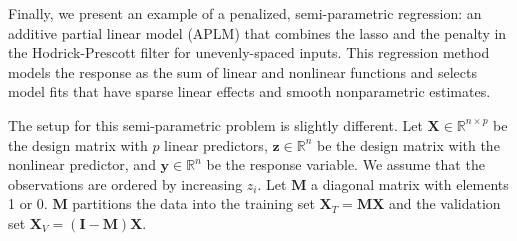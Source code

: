 \documentclass[10pt,letterpaper]{article}
\begin{document}
Finally, we present an example of a penalized, semi-parametric regression: an additive partial linear model (APLM) that combines the lasso and the penalty in the Hodrick-Prescott filter for unevenly-spaced inputs. This regression method models the response as the sum of linear and nonlinear functions and selects model fits that have sparse linear effects and smooth nonparametric estimates.

The setup for this semi-parametric problem is slightly different. Let $\boldsymbol{X} \in \mathbb{R}^{n \times p}$ be the design matrix with $p$ linear predictors, $\boldsymbol{z} \in \mathbb{R}^n$ be the design matrix with the nonlinear predictor, and $\boldsymbol{y} \in \mathbb{R}^n$ be the response variable. We assume that the observations are ordered by increasing $z_i$. Let $\boldsymbol{M}$ a diagonal matrix with elements 1 or 0. $\boldsymbol{M}$ partitions the data into the training set $\boldsymbol{X}_T= \boldsymbol{M} \boldsymbol{X}$ and the validation set $\boldsymbol{X}_V= (\boldsymbol{I} - \boldsymbol{M}) \boldsymbol{X}$.
\end{document}

